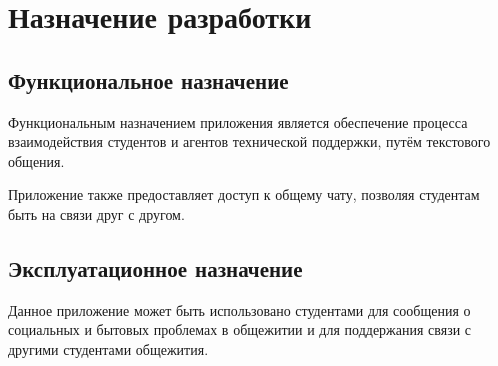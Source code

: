 \section{Назначение разработки}

\subsection{Функциональное назначение}

Функциональным назначением приложения является обеспечение процесса взаимодействия студентов и агентов технической поддержки, путём текстового общения.

Приложение также предоставляет доступ к общему чату, позволяя студентам быть на связи друг с другом.

\subsection{Эксплуатационное назначение}

Данное приложение может быть использовано студентами для сообщения о социальных и бытовых проблемах в общежитии и для поддержания связи с другими студентами общежития.
